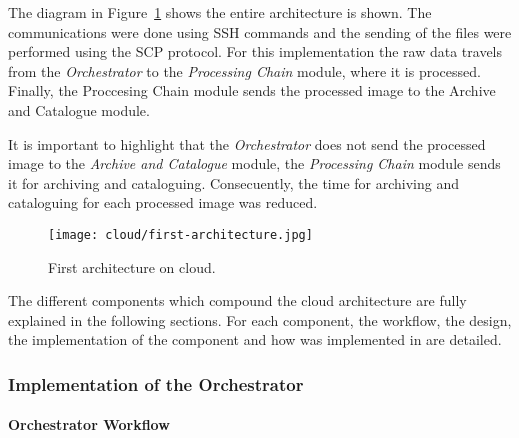 The diagram in Figure~\ref{fig:first-architecture} shows the entire architecture is shown. The
communications were done using \ac{SSH} commands and the sending of the files were
performed using the \ac{SCP} protocol. For this implementation the raw data
travels from the \emph{Orchestrator} to the \emph{Processing Chain} module, where it is
processed. 
Finally, the Proccesing Chain module sends the processed image to the
Archive and
Catalogue module. 

It is important to highlight that the
\emph{Orchestrator} does not send the processed image to the \emph{Archive and Catalogue}
module, the \emph{Processing Chain} module sends it for archiving and cataloguing. Consecuently, the time for
archiving and cataloguing for each processed image was reduced.

\begin{figure}[!h]
\begin{center}
\texttt{[image: cloud/first-architecture.jpg]}
\caption{First architecture on cloud.}
\label{fig:first-architecture}
\end{center}
\end{figure}

The different components which compound the cloud architecture are fully
explained in the following sections. For each component, the  workflow, the
design, the implementation of the component and how was implemented in \bonfire are detailed.

\subsubsection{Implementation of the Orchestrator}

\paragraph{Orchestrator Workflow}~\\

